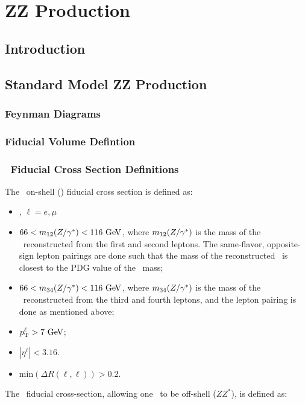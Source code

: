 \graphicspath{{Chapters/TheoryZZProduction/Figures/}}
\chapter{ZZ Production}
\label{chap:TheoryZZProduction}

\section{Introduction}
\section{Standard Model ZZ Production}
\subsection{Feynman Diagrams}
\subsection{Fiducial Volume Defintion}

\subsection{\zzllll\ Fiducial Cross Section Definitions}

The \zzllll\ on-shell (\ZZ) fiducial cross section is defined as:
\begin{itemize}
\item{\ZorgZorglplmlplm, $\ell = e,\mu$}
\item{ $66 < m_{12}(\Z/\gamma^*) <  116\GeV$, where $m_{12}(Z/\gamma^*)$ is
the mass of the \Z\ reconstructed from the first and second leptons.  The
same-flavor, opposite-sign lepton pairings are done such that the mass of the 
reconstructed \Z\ is closest to the PDG value of the \Z\ mass;}
\item{ $66 < m_{34}(\Z/\gamma^*) <  116\GeV$, where $m_{34}(Z/\gamma^*)$ is
the mass of the \Z\ reconstructed from the third and fourth leptons, and the
lepton pairing is done as mentioned above;}
\item $\pT^{\ell} > 7\GeV$;
\item $|\eta^{\ell}| < 3.16$.
\item{$\mathrm{min}(\Delta R(\ell,\ell)) > 0.2$.}
\end{itemize}

The \zzllll\ fiducial cross-section, allowing one \Z\ to be off-shell ($ZZ^*$), is defined as:

